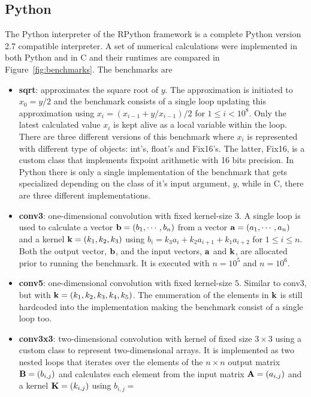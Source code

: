 \documentclass[preprint]{sigplanconf}
\begin{document}
\subsection{Python}
The Python interpreter of the RPython framework is a complete Python
version 2.7 compatible interpreter. A set of numerical
calculations were implemented in both Python and in C and their
runtimes are compared in Figure~\ref{fig:benchmarks}. The benchmarks are
\begin{itemize}
\item {\bf sqrt}: approximates the square root of $y$. The approximation is 
initiated to $x_0=y/2$ and the benchmark consists of a single loop updating this
approximation using $x_i = \left( x_{i-1} + y/x_{i-1} \right) / 2$ for $1\leq i < 10^8$. 
Only the latest calculated value $x_i$ is kept alive as a local variable within the loop.
There are three different versions of this benchmark where $x_i$
  is represented with different type of objects: int's, float's and
  Fix16's. The latter, Fix16, is a custom class that implements
  fixpoint arithmetic with 16 bits precision. In Python there is only
  a single implementation of the benchmark that gets specialized
  depending on the class of it's input argument, $y$, while in C,
  there are three different implementations.
\item {\bf conv3}: one-dimensional convolution with fixed kernel-size $3$. A single loop
is used to calculate a vector ${\bf b} = \left(b_1, \cdots, b_n\right)$ from a vector
${\bf a} = \left(a_1, \cdots, a_n\right)$ and a kernel ${\bf k} = \left(k_1, k_2, k_3\right)$ using 
$b_i = k_3 a_i + k_2 a_{i+1} + k_1 a_{i+2}$ for $1 \leq i \leq n$. Both the output vector, $\bf b$, 
and the input vectors, $\bf a$ and $\bf k$, are allocated prior to running the benchmark. It is executed 
with $n=10^5$ and $n=10^6$.
\item {\bf conv5}: one-dimensional convolution with fixed kernel-size $5$. Similar to conv3, but with 
${\bf k} = \left(k_1, k_2, k_3, k_4, k_5\right)$. The enumeration of the elements in $\bf k$ is still 
hardcoded into the implementation making the benchmark consist of a single loop too.
\item {\bf conv3x3}: two-dimensional convolution with kernel of fixed
  size $3 \times 3$ using a custom class to represent two-dimensional
  arrays. It is implemented as two nested loops that iterates over the elements of the 
$n\times n$ output matrix ${\bf B} = \left(b_{i,j}\right)$ and calculates each element from the input matrix
${\bf A} = \left(a_{i,j}\right)$ and a kernel ${\bf K} = \left(k_{i,j}\right)$ using $b_{i,j} = $

\end{itemize}
\end{document}

